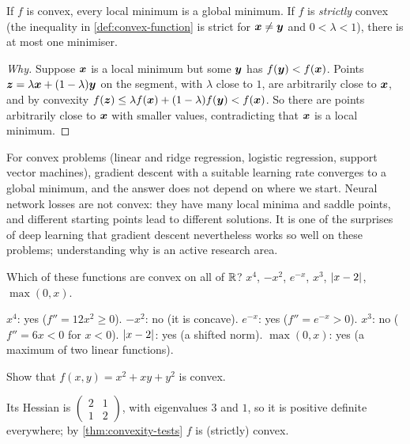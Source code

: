 \begin{theorem}\label{thm:convex-global}
If $f$ is convex, every local minimum is a global minimum. If $f$ is
\emph{strictly} convex (the inequality in \cref{def:convex-function} is strict for
$\bm{x} \neq \bm{y}$ and $0 < \lambda < 1$), there is at most one minimiser.
\end{theorem}

\begin{proof}[Why]
Suppose $\bm{x}$ is a local minimum but some $\bm{y}$ has $f(\bm{y}) < f(\bm{x})$. Points
$\bm{z} = \lambda\bm{x} + (1 - \lambda)\bm{y}$ on the segment, with $\lambda$ close to
$1$, are arbitrarily close to $\bm{x}$, and by convexity
$f(\bm{z}) \le \lambda f(\bm{x}) + (1 - \lambda)f(\bm{y}) < f(\bm{x})$. So there are points
arbitrarily close to $\bm{x}$ with smaller values, contradicting that $\bm{x}$ is a
local minimum.
\end{proof}

\begin{mlnote}
For convex problems (linear and ridge regression, logistic regression, support
vector machines), gradient descent with a suitable learning rate converges to a
global minimum, and the answer does not depend on where we start. Neural network
losses are not convex: they have many local minima and saddle points, and
different starting points lead to different solutions. It is one of the
surprises of deep learning that gradient descent nevertheless works so well on
these problems; understanding why is an active research area.
\end{mlnote}

\sectionexercises

\begin{exercise}
Which of these functions are convex on all of $\mathbb{R}$? $x^4$, $-x^2$, $e^{-x}$,
$x^3$, $\lvert x - 2\rvert$, $\max(0, x)$.
\end{exercise}
\begin{solution}
$x^4$: yes ($f'' = 12x^2 \ge 0$). $-x^2$: no (it is concave). $e^{-x}$: yes
($f'' = e^{-x} > 0$). $x^3$: no ($f'' = 6x < 0$ for $x < 0$). $\lvert x - 2\rvert$: yes
(a shifted norm). $\max(0, x)$: yes (a maximum of two linear functions).
\end{solution}

\begin{exercise}
Show that $f(x, y) = x^2 + xy + y^2$ is convex.
\end{exercise}
\begin{solution}
Its Hessian is $\left(\begin{smallmatrix} 2 & 1\\ 1 & 2\end{smallmatrix}\right)$,
with eigenvalues $3$ and $1$, so it is positive definite everywhere; by
\cref{thm:convexity-tests} $f$ is (strictly) convex.
\end{solution}

